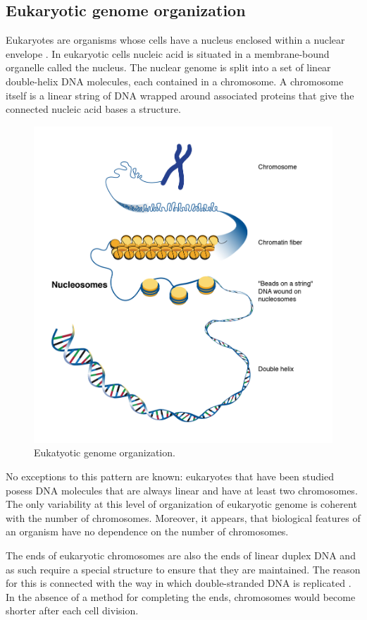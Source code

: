 \subsection{Eukaryotic genome organization}
Eukaryotes are organisms whose cells have a nucleus enclosed within a nuclear envelope \cite{BioDict}.
In eukaryotic cells nucleic acid is situated in a membrane-bound organelle called the nucleus.
The nuclear genome is split into a set of linear double-helix DNA molecules, each contained in a chromosome. 
A chromosome itself is a linear string of DNA wrapped around associated proteins that give the connected nucleic acid bases a structure.

\begin{figure}[!ht]
	\centering
	\includegraphics[width=.8\textwidth]{figures/nucleosome1}
	\caption{Eukatyotic genome organization.\label{o:latex_friendly_zone}}
\end{figure}

No exceptions to this pattern are known: eukaryotes that have been studied posess DNA molecules that are always linear and have at least two chromosomes. \cite{Genomes3}
The only variability at this level of organization of eukaryotic genome is coherent with the number of chromosomes. 
Moreover, it appears, that biological features of an organism have no dependence on the number of chromosomes. 

The ends of eukaryotic chromosomes are also the ends of linear duplex DNA and as such require a special structure to ensure that they are maintained. 
The reason for this is connected with the way in which double-stranded DNA is replicated \cite{PrinciplesOfGeneManipulation}.
In the absence of a method for completing the ends, chromosomes would become shorter after each cell division.

